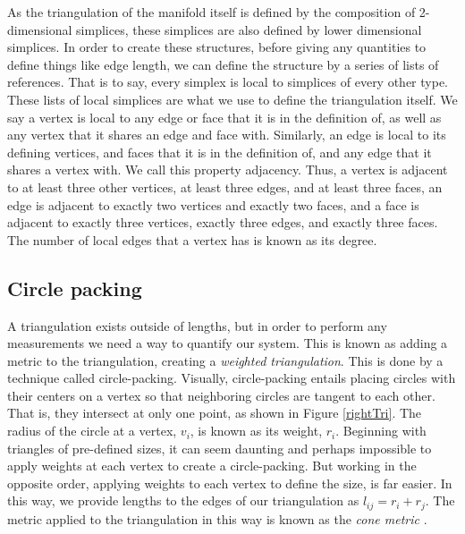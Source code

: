 \documentclass[12pt]{article}
\begin{document}
\noindent As the triangulation of the manifold itself is defined by the composition of 2-dimensional simplices, these simplices are also defined by lower dimensional simplices. In order to create these structures, before giving any quantities to define things like edge length, we can define the structure by a series of lists of references. That is to say, every simplex is local to simplices of every other type. These lists of local simplices are what we use to define the triangulation itself. We say a vertex is local to any edge or face that it is in the definition of, as well as any vertex that it shares an edge and face with. Similarly, an edge is local to its defining vertices, and faces that it is in the definition of, and any edge that it shares a vertex with. We call this property adjacency. Thus, a vertex is adjacent to at least three other vertices, at least three edges, and at least three faces, an edge is adjacent to exactly two vertices and exactly two faces, and a face is adjacent to exactly three vertices, exactly three edges, and exactly three faces. The number of local edges that a vertex has is known as its degree.


\subsection{Circle packing}
\maketitle

\noindent A triangulation exists outside of lengths, but in order to perform any measurements we need a way to quantify our system. This is known as adding a metric to the triangulation, creating a \textit{weighted triangulation}. This is done by a technique called circle-packing. Visually, circle-packing entails placing circles with their centers on a vertex so that neighboring circles are tangent to each other. That is, they intersect at only one point, as shown in Figure \ref{rightTri}. The radius of the circle at a vertex, $v_i$, is known as its weight, $r_i$. Beginning with triangles of pre-defined sizes, it can seem daunting and perhaps impossible to apply weights at each vertex to create a circle-packing. But working in the opposite order, applying weights to each vertex to define the size, is far easier. In this way, we provide lengths to the edges of our triangulation as $l_{ij}=r_i+r_j$. The metric applied to the triangulation in this way is known as the \textit{cone metric} \cite{chowluo}. \newline
\end{document}

